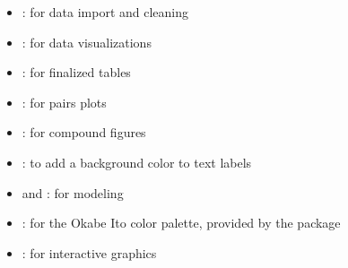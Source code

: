 \begin{itemize}
\tightlist
\item
   \citep{tidyverse2019}: for data import and
  cleaning
\item
   \citep{R-ggplot2}: for data visualizations
\item
   \citep{R-kableExtra}: for finalized tables
\item
   \citep{R-GGally}: for pairs plots
\item
   \citep{R-patchwork}: for compound figures
\item
   \citep{R-shadowtext}: to add a background color
  to text labels
\item
   \citep{R-recipes} and 
  \citep{R-broom}: for modeling
\item
   \citep{R-paletteer}: for the Okabe Ito color
  palette, provided by the  package
\item
   \citep{R-plotly}: for interactive graphics
\end{itemize}



\address{%
Allison M. Horst\\
University of California Santa Barbara\\%
Bren School of Environmental Science and Management\\ Santa Barbara, CA
93106-5131\\
%
%
%
\href{mailto:ahorst@ucsb.edu}{\nolinkurl{ahorst@ucsb.edu}}%
}

\address{%
Alison Presmanes Hill\\
Voltron Data\\%
\\
%
%
%
\href{mailto:apreshill@gmail.com}{\nolinkurl{apreshill@gmail.com}}%
}

\address{%
Kristen B. Gorman\\
University of Alaska Fairbanks\\%
College of Fisheries and Ocean Sciences\\ 2150 Koyukuk Drive\\ 245
O'Neill Building\\ Fairbanks, AK 99775-7220\\
%
%
%
\href{mailto:kbgorman@alaska.edu}{\nolinkurl{kbgorman@alaska.edu}}%
}
